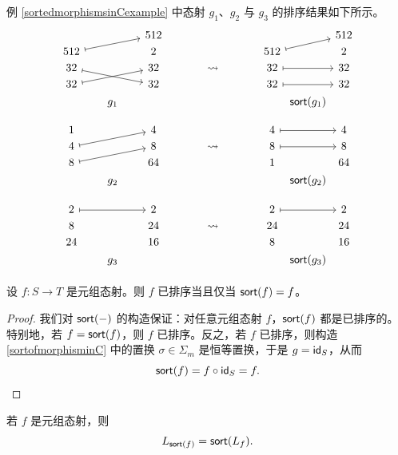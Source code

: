 \begin{example} 例 \ref{sortedmorphismsinCexample} 中态射 $g_1$、$g_2$ 与 $g_3$ 的排序结果如下所示。
    \[ \begin{tikzcd} [row sep = 1, column sep = 16]
    & & 512 & & & & & & 512\\
    512 \ar[urr,mapsto] & & 2 & & & & 512 \ar[urr,mapsto] & & 2\\
    32 \ar[drr,mapsto] & & 32 & & \rightsquigarrow & & 32 \ar[rr,mapsto] & & 32\\
    32 \ar[urr,mapsto] & & 32 & & & & 32 \ar[rr,mapsto] & & 32\\
    & g_1 & & & & & & \mathclap{\sort(g_1)} & \\
 & \vspace{0.2in} & & &  & & & & \\
        1 & & 4 & & & & 4\ar[rr,mapsto]  & & 4\\
    4 \ar[urr,mapsto] & & 8 & & \rightsquigarrow & & 8 \ar[rr,mapsto] & & 8\\
    8  \ar[urr,mapsto] & & 64 & & & & 1 & & 64\\
    & g_2 & & & & & & \mathclap{\sort(g_2)} & \\
     & \vspace{0.2in} & & &  & & & & \\
     & & & & & & & & \\
        2  \ar[rr,mapsto] & & 2 & & & & 2 \ar[rr,mapsto]  & & 2\\
    8  & & 24 & & \rightsquigarrow & & 24  & & 24\\
    24    & & 16 & & & & 8 & & 16\\
    & g_3 & & & & & & \mathclap{\sort(g_3)} & \\
    \end{tikzcd} \]
\end{example}

\begin{lemma}
    设 $f:S \to T$ 是元组态射。则 $f$ 已排序当且仅当 $\mathsf{sort}(f) = f$。
\end{lemma}
\begin{proof}
    我们对 $\mathsf{sort}(-)$ 的构造保证：对任意元组态射 $f$，$\mathsf{sort}(f)$ 都是已排序的。特别地，若 $f = \mathsf{sort}(f)$，则 $f$ 已排序。反之，若 $f$ 已排序，则构造 \ref{sortofmorphisminC} 中的置换 $\sigma \in \Sigma_m$ 是恒等置换，于是 $g = \mathsf{id}_S$，从而
    \[
    \mathsf{sort}(f) = f \circ \mathsf{id}_S = f.
    \]
\end{proof}

\begin{proposition}\label{sortofmorphisminCcompatibility} 若 $f$ 是元组态射，则
\[
L_{\mathsf{sort}(f)} = \mathsf{sort}(L_f).
\]
\end{proposition}

